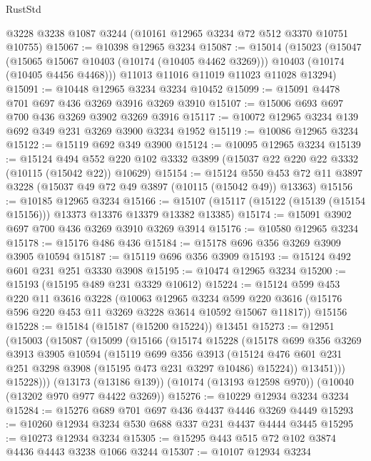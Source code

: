 \begin{lexlean}{RustStd}
\begin{coremodule}
    @3228
    @3238
    @1087
    @3244
    (@10161 @12965 @3234 @72 @512 @3370 @10751 @10755)
@15067 := @10398 @12965 @3234
@15087 := @15014
    (@15023
      (@15047
        (@15065 @15067 @10403 (@10174 (@10405 @4462 @3269)))
        @10403
        (@10174 (@10405 @4456 @4468)))
      @11013
      @11016
      @11019
      @11023
      @11028
      @13294)
@15091 := @10448 @12965 @3234 @3234 @10452
@15099 := @15091 @4478 @701 @697 @436 @3269 @3916 @3269 @3910
@15107 := @15006 @693 @697 @700 @436 @3269 @3902 @3269 @3916
@15117 := @10072 @12965 @3234 @139 @692 @349 @231 @3269 @3900 @3234 @1952
@15119 := @10086 @12965 @3234
@15122 := @15119 @692 @349 @3900
@15124 := @10095 @12965 @3234
@15139 := @15124
    @494
    @552
    @220
    @102
    @3332
    @3899
    (@15037 @22 @220 @22 @3332 (@10115 (@15042 @22)) @10629)
@15154 := @15124
    @550
    @453
    @72
    @11
    @3897
    @3228
    (@15037 @49 @72 @49 @3897 (@10115 (@15042 @49)) @13363)
@15156 := @10185 @12965 @3234
@15166 := @15107 (@15117 (@15122 (@15139 (@15154 @15156))) @13373 @13376 @13379 @13382 @13385)
@15174 := @15091 @3902 @697 @700 @436 @3269 @3910 @3269 @3914
@15176 := @10580 @12965 @3234
@15178 := @15176 @486 @436
@15184 := @15178 @696 @356 @3269 @3909 @3905 @10594
@15187 := @15119 @696 @356 @3909
@15193 := @15124 @492 @601 @231 @251 @3330 @3908
@15195 := @10474 @12965 @3234
@15200 := @15193 (@15195 @489 @231 @3329 @10612)
@15224 := @15124
    @599
    @453
    @220
    @11
    @3616
    @3228
    (@10063
      @12965
      @3234
      @599
      @220
      @3616
      (@15176 @596 @220 @453 @11 @3269 @3228 @3614 @10592 @15067 @11817))
    @15156
@15228 := @15184 (@15187 (@15200 @15224)) @13451
@15273 := @12951
    (@15003
      (@15087
        (@15099
          (@15166
            (@15174
              @15228
              (@15178
                @699
                @356
                @3269
                @3913
                @3905
                @10594
                (@15119
                  @699
                  @356
                  @3913
                  (@15124 @476 @601 @231 @251 @3298 @3908 (@15195 @473 @231 @3297 @10486) @15224))
                @13451)))
          @15228)))
    (@13173 (@13186 @139))
    (@10174 (@13193 @12598 @970))
    (@10040 (@13202 @970 @977 @4422 @3269))
@15276 := @10229 @12934 @3234 @3234
@15284 := @15276 @689 @701 @697 @436 @4437 @4446 @3269 @4449
@15293 := @10260 @12934 @3234 @530 @688 @337 @231 @4437 @4444 @3445
@15295 := @10273 @12934 @3234
@15305 := @15295 @443 @515 @72 @102 @3874 @4436 @4443 @3238 @1066 @3244
@15307 := @10107 @12934 @3234

\end{coremodule}
\end{lexlean}
